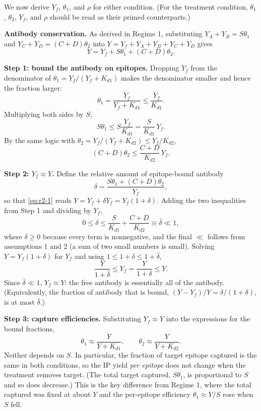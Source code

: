 We now derive $Y_f$, $\theta_1$, and $\rho$ for either condition. (For the
treatment condition, $\theta_1$, $\theta_2$, $Y_f$, and $\rho$ should be
read as their primed counterparts.)

\textbf{Antibody conservation.} As derived in Regime 1, substituting
$Y_A+Y_B=S\theta_1$ and $Y_C+Y_D=(C+D)\theta_2$ into
$Y=Y_f+Y_A+Y_B+Y_C+Y_D$ gives
\begin{equation}
Y=Y_f+S\theta_1+(C+D)\theta_2.
\label{eq:r2-1}
\end{equation}

\textbf{Step 1: bound the antibody on epitopes.} Dropping $Y_f$ from the
denominator of $\theta_1=Y_f/(Y_f+K_{d1})$ makes the denominator smaller
and hence the fraction larger:
$$
\theta_1=\frac{Y_f}{Y_f+K_{d1}}\le\frac{Y_f}{K_{d1}}.
$$
Multiplying both sides by $S$,
$$
S\theta_1\le S\frac{Y_f}{K_{d1}}=\frac{S}{K_{d1}}\,Y_f.
$$
By the same logic with $\theta_2=Y_f/(Y_f+K_{d2})\le Y_f/K_{d2}$,
$$
(C+D)\theta_2\le\frac{C+D}{K_{d2}}\,Y_f.
$$

\textbf{Step 2: $Y_f\approx Y$.} Define the relative amount of
epitope-bound antibody
$$
\delta=\frac{S\theta_1+(C+D)\theta_2}{Y_f},
$$
so that \eqref{eq:r2-1} reads $Y=Y_f+\delta Y_f=Y_f(1+\delta)$. Adding the
two inequalities from Step 1 and dividing by $Y_f$,
\begin{equation}
0\le\delta
\le\frac{S}{K_{d1}}+\frac{C+D}{K_{d2}}
\equiv\bar\delta
\ll1,
\label{eq:r2-2}
\end{equation}
where $\delta\ge0$ because every term is nonnegative, and the final
$\ll$ follows from assumptions 1 and 2 (a sum of two small numbers is
small). Solving $Y=Y_f(1+\delta)$ for $Y_f$ and using
$1\le1+\delta\le1+\bar\delta$,
\begin{equation}
\frac{Y}{1+\bar\delta}\le Y_f=\frac{Y}{1+\delta}\le Y.
\label{eq:r2-3}
\end{equation}
Since $\bar\delta\ll1$, $Y_f\approx Y$: the free antibody is essentially
all of the antibody. (Equivalently, the fraction of antibody that is
bound, $(Y-Y_f)/Y=\delta/(1+\delta)$, is at most $\bar\delta$.)

\textbf{Step 3: capture efficiencies.} Substituting $Y_f\approx Y$ into
the expressions for the bound fractions,
$$
\theta_1\approx\frac{Y}{Y+K_{d1}},
\qquad
\theta_2\approx\frac{Y}{Y+K_{d2}}.
$$
Neither depends on $S$. In particular, the fraction of target epitope
captured is the same in both conditions, so the IP yield \emph{per
epitope} does not change when the treatment removes target. (The total
target captured, $S\theta_1$, is proportional to $S$ and so does
decrease.) This is the key difference from Regime 1, where the total
captured was fixed at about $Y$ and the per-epitope efficiency
$\theta_1\approx Y/S$ rose when $S$ fell.

